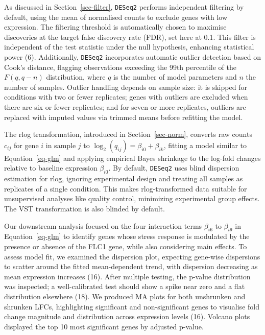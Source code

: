 \documentclass[
  a4paper,
]{scrreprt}
\begin{document}
As discussed in Section~\ref{sec-filter}, \texttt{DESeq2} performs
independent filtering by default, using the mean of normalised counts to
exclude genes with low expression. The filtering threshold is
automatically chosen to maximise discoveries at the target false
discovery rate (FDR), set here at 0.1. This filter is independent of the
test statistic under the null hypothesis, enhancing statistical power
(6). Additionally, \texttt{DESeq2} incorporates automatic outlier
detection based on Cook's distance, flagging observations exceeding the
99th percentile of the \(F(q, q-n)\) distribution, where \(q\) is the
number of model parameters and \(n\) the number of samples. Outlier
handling depends on sample size: it is skipped for conditions with two
or fewer replicates; genes with outliers are excluded when there are six
or fewer replicates; and for seven or more replicates, outliers are
replaced with imputed values via trimmed means before refitting the
model.

The rlog transformation, introduced in Section~\ref{sec-norm}, converts
raw counts \(c_{ij}\) for gene \(i\) in sample \(j\) to
\(\log_2(q_{ij}) = \beta_{i0} + \beta_{ik}\), fitting a model similar to
Equation~\ref{eq-glm} and applying empirical Bayes shrinkage to the
log-fold changes relative to baseline expression \(\beta_{i0}\). By
default, \texttt{DESeq2} uses blind dispersion estimation for rlog,
ignoring experimental design and treating all samples as replicates of a
single condition. This makes rlog-transformed data suitable for
unsupervised analyses like quality control, minimizing experimental
group effects. The VST transformation is also blinded by default.

Our downstream analysis focused on the four interaction terms
\(\beta_{i6}\) to \(\beta_{i9}\) in Equation~\ref{eq-glm} to identify
genes whose stress response is modulated by the presence or absence of
the FLC1 gene, while also considering main effects. To assess model fit,
we examined the dispersion plot, expecting gene-wise dispersions to
scatter around the fitted mean-dependent trend, with dispersion
decreasing as mean expression increases (16). After multiple testing,
the p-value distribution was inspected; a well-calibrated test should
show a spike near zero and a flat distribution elsewhere (18). We
produced MA plots for both unshrunken and shrunken LFCs, highlighting
significant and non-significant genes to visualise fold change magnitude
and distribution across expression levels (16). Volcano plots displayed
the top 10 most significant genes by adjusted p-value.
\end{document}

